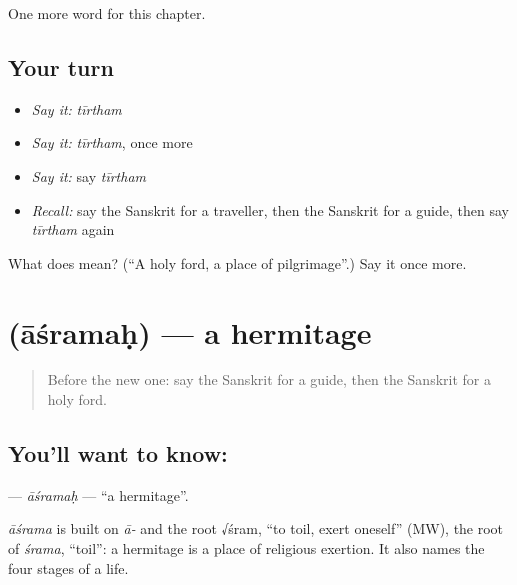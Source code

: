 \begin{grammarlens}[title={What you've built}]
One more word for this chapter.
\end{grammarlens}

\subsection*{Your turn}
\begin{itemize}
\raggedright
  \item \emph{Say it:} \emph{tīrtham}
  \item \emph{Say it:} \emph{tīrtham}, once more
  \item \emph{Say it:} say \emph{tīrtham}
  \item \emph{Recall:} say the Sanskrit for a traveller, then the Sanskrit for a guide, then say \emph{tīrtham} again
\end{itemize}

\begin{tcolorbox}[breakable,colback=teal!4,colframe=teal!35!black,title={Before you move on}]
What does  mean? (\textquotedblleft{}A holy ford, a place of pilgrimage\textquotedblright{}.) Say it once more.
\end{tcolorbox}
\section[\texorpdfstring{\sk{आश्रमः} (āśramaḥ)}{आश्रमः (āśramaḥ)}]{ (āśramaḥ) — a hermitage}

\label{lesson:SA-C223-asramah}



\begin{quote}
Before the new one: say the Sanskrit for a guide, then the Sanskrit for a holy ford.
\end{quote}

\subsection*{You'll want to know: }
\textbf{} — \emph{āśramaḥ} — \textquotedblleft{}a hermitage\textquotedblright{}.

\begin{cousinweb}
\emph{āśrama} is built on \emph{ā-} and the root √śram, \textquotedblleft{}to toil, exert oneself\textquotedblright{} (MW), the root of \emph{śrama}, \textquotedblleft{}toil\textquotedblright{}: a hermitage is a place of religious exertion. It also names the four stages of a life.
\end{cousinweb}

